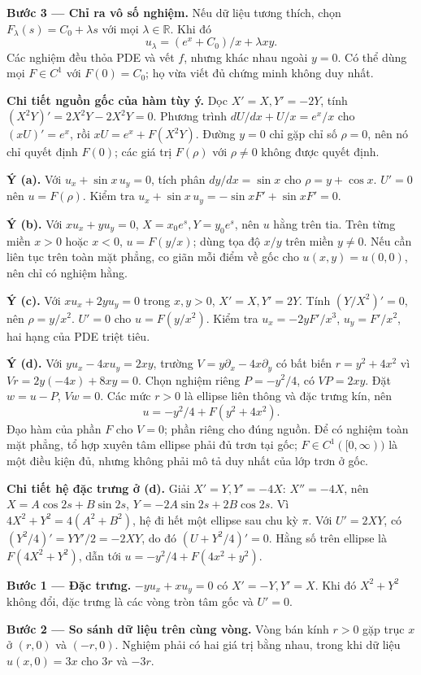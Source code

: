 \textbf{Bước 3 — Chỉ ra vô số nghiệm.} Nếu dữ liệu tương thích, chọn $F_\lambda(s)=C_0+\lambda s$ với mọi $\lambda\in\mathbb R$. Khi đó
\[u_\lambda=(e^x+C_0)/x+\lambda xy.\]
Các nghiệm đều thỏa PDE và vết $f$, nhưng khác nhau ngoài $y=0$. Có thể dùng mọi $F\in C^1$ với $F(0)=C_0$; họ vừa viết đủ chứng minh không duy nhất.

\textbf{Chi tiết nguồn gốc của hàm tùy ý.} Dọc $X'=X,Y'=-2Y$, tính $(X^2Y)'=2X^2Y-2X^2Y=0$. Phương trình $dU/dx+U/x=e^x/x$ cho $(xU)'=e^x$, rồi $xU=e^x+F(X^2Y)$. Đường $y=0$ chỉ gặp chỉ số $\rho=0$, nên nó chỉ quyết định $F(0)$; các giá trị $F(\rho)$ với $\rho\ne0$ không được quyết định.

\textbf{Ý (a).} Với $u_x+\sin x\,u_y=0$, tích phân $dy/dx=\sin x$ cho $\rho=y+\cos x$. $U'=0$ nên $u=F(\rho)$. Kiểm tra $u_x+\sin x\,u_y=-\sin xF'+\sin xF'=0$.

\textbf{Ý (b).} Với $xu_x+yu_y=0$, $X=x_0e^s,Y=y_0e^s$, nên $u$ hằng trên tia. Trên từng miền $x>0$ hoặc $x<0$, $u=F(y/x)$; dùng tọa độ $x/y$ trên miền $y\ne0$. Nếu cần liên tục trên toàn mặt phẳng, co giãn mỗi điểm về gốc cho $u(x,y)=u(0,0)$, nên chỉ có nghiệm hằng.

\textbf{Ý (c).} Với $xu_x+2yu_y=0$ trong $x,y>0$, $X'=X,Y'=2Y$. Tính $(Y/X^2)'=0$, nên $\rho=y/x^2$. $U'=0$ cho $u=F(y/x^2)$. Kiểm tra $u_x=-2yF'/x^3$, $u_y=F'/x^2$, hai hạng của PDE triệt tiêu.

\textbf{Ý (d).} Với $yu_x-4xu_y=2xy$, trường $V=y\partial_x-4x\partial_y$ có bất biến $r=y^2+4x^2$ vì $Vr=2y(-4x)+8xy=0$. Chọn nghiệm riêng $P=-y^2/4$, có $VP=2xy$. Đặt $w=u-P$, $Vw=0$. Các mức $r>0$ là ellipse liên thông và đặc trưng kín, nên
\[u=-y^2/4+F(y^2+4x^2).\]
Đạo hàm của phần $F$ cho $V=0$; phần riêng cho đúng nguồn. Để có nghiệm toàn mặt phẳng, tổ hợp xuyên tâm ellipse phải đủ trơn tại gốc; $F\in C^1([0,\infty))$ là một điều kiện đủ, nhưng không phải mô tả duy nhất của lớp trơn ở gốc.

\textbf{Chi tiết hệ đặc trưng ở (d).} Giải $X'=Y,Y'=-4X$: $X''=-4X$, nên $X=A\cos2s+B\sin2s$, $Y=-2A\sin2s+2B\cos2s$. Vì $4X^2+Y^2=4(A^2+B^2)$, hệ đi hết một ellipse sau chu kỳ $\pi$. Với $U'=2XY$, có $(Y^2/4)'=YY'/2=-2XY$, do đó $(U+Y^2/4)'=0$. Hằng số trên ellipse là $F(4X^2+Y^2)$, dẫn tới $u=-y^2/4+F(4x^2+y^2)$.

\textbf{Bước 1 — Đặc trưng.} $-yu_x+xu_y=0$ có $X'=-Y,Y'=X$. Khi đó $X^2+Y^2$ không đổi, đặc trưng là các vòng tròn tâm gốc và $U'=0$.

\textbf{Bước 2 — So sánh dữ liệu trên cùng vòng.} Vòng bán kính $r>0$ gặp trục $x$ ở $(r,0)$ và $(-r,0)$. Nghiệm phải có hai giá trị bằng nhau, trong khi dữ liệu $u(x,0)=3x$ cho $3r$ và $-3r$.

